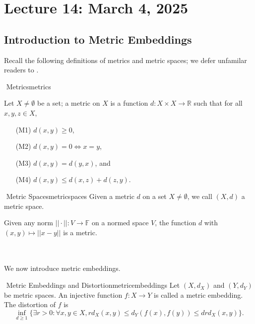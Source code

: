 \section{Lecture 14: March 4, 2025}

    \subsection{Introduction to Metric Embeddings}

        Recall the following definitions of metrics and metric spaces; we defer unfamilar readers to \cite{rudin1976principles,lang1997analysis}.
        \begin{definition}{\Stop\,\,Metrics}{metrics}
            
            Let \(X\neq\emptyset\) be a set; a metric on \(X\) is a function \(d:X\times X\to\mathbb{R}\) such that for all \(x,y,z\in X\),
            \begin{enumerate}
                \item[(M1)] \(d(x,y)\geq0\),
                \item[(M2)] \(d(x,y)=0\iff x=y\),
                \item[(M3)] \(d(x,y)=d(y,x)\), and
                \item[(M4)] \(d(x,y)\leq d(x,z)+d(z,y)\).
            \end{enumerate}

        \end{definition}
        \begin{definition}{\Stop\,\,Metric Spaces}{metricspaces}
            Given a metric \(d\) on a set \(X\neq\emptyset\), we call \((X,d)\) a metric space.
        \end{definition}
        \begin{remark*}
            Given any norm \(||\cdot||:V\to\mathbb{F}\) on a normed space \(V\), the function \(d\) with \((x,y)\mapsto ||x-y||\) is a metric.
        \end{remark*}
        \pagebreak
        \vphantom
        \\
        \\
        We now introduce metric embeddings.
        \begin{definition}{\Stop\,\,Metric Embeddings and Distortion}{metricembeddings}
            Let \((X,d_X)\) and \((Y,d_Y)\) be metric spaces. An injective function \(f:X\to Y\) is called a metric embedding. The distortion of \(f\) is 
            \begin{equation*}
                \inf_{d\geq 1}\{\exists r>0:\forall x,y\in X, rd_X(x,y)\leq d_Y(f(x),f(y))\leq drd_X(x,y)\}.
            \end{equation*}
        \end{definition}

